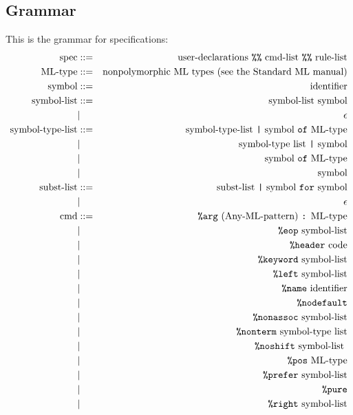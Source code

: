 \subsection{Grammar}

This is the grammar for specifications:
\begin{eqnarray*}
\mbox{spec} & ::= & \mbox{user-declarations {\tt \%\%} cmd-list {\tt \%\%} rule-list} \\
\mbox{ML-type} & ::= & \mbox{nonpolymorphic ML types (see the Standard ML manual)} \\
\mbox{symbol} & ::= & \mbox{identifier} \\
\mbox{symbol-list} & ::= & \mbox{symbol-list symbol} \\
              &  | & \epsilon \\
\mbox{symbol-type-list} & ::= & \mbox{symbol-type-list {\tt |} symbol {\tt of} ML-type} \\
                   & | & \mbox{symbol-type list {\tt |} symbol} \\
                   & | & \mbox{symbol {\tt of} ML-type} \\
                   & | & \mbox{symbol} \\
\mbox{subst-list} & ::= & \mbox{subst-list {\tt |} symbol {\tt for} symbol} \\
             &  |  & \epsilon \\
\mbox{cmd} & ::= & \mbox{{\tt \%arg} (Any-ML-pattern) {\tt :} ML-type} \\
 & | & \mbox{{\tt \%eop} symbol-list} \\
 & | & \mbox{{\tt \%header} code} \\
 & | & \mbox{{\tt \%keyword} symbol-list} \\
 & | & \mbox{{\tt \%left} symbol-list} \\
 & | & \mbox{{\tt \%name} identifier} \\
 & | & \mbox{{\tt \%nodefault}} \\
 & | & \mbox{{\tt \%nonassoc} symbol-list} \\
 & | & \mbox{{\tt \%nonterm} symbol-type list} \\
 & | & \mbox{{\tt \%noshift} symbol-list } \\
 & | & \mbox{{\tt \%pos} ML-type} \\
 & | & \mbox{{\tt \%prefer} symbol-list} \\
 & | & \mbox{\tt \%pure} \\
 & | & \mbox{{\tt \%right} symbol-list} \\

\end{eqnarray*}

